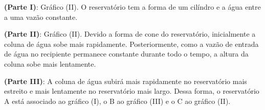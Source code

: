 \documentclass[10 pt,usenames,dvipsnames, oneside]{article}
\begin{document}
\ifdefined\prof

\begin{solucao}

\textbf{(Parte I)}: Gráfico (II). O reservatório tem a forma de um cilíndro e a água entre a uma vazão constante.

\textbf{(Parte II)}: Gráfico (II). Devido a forma de cone do reservatório, inicialmente a coluna de água sobe mais rapidamente. Posteriormente, como a vazão de entrada de água no recipiente permanece constante durante todo o tempo, a altura da coluna sobe mais lentamente.

\textbf{(Parte III)}: A coluna de água subirá mais rapidamente no reservatório mais estreito e mais lentamente no reservatório mais largo. Dessa forma, o reservatório A está associado ao gráfico (I), o B ao gráfico (III) e o C ao gráfico (II).
\end{solucao}
\fi
\end{document}
